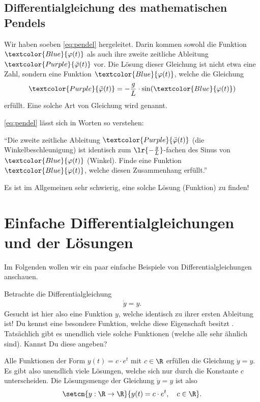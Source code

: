 \subsection{Differentialgleichung des mathematischen Pendels}
Wir haben soeben \cref{eq:pendel} hergeleitet. Darin kommen sowohl die Funktion $\textcolor{Blue}{\varphi (t)}$ als auch ihre zweite zeitliche Ableitung $\textcolor{Purple}{\ddot{\varphi} (t)}$ vor. 
Die Lösung dieser Gleichung ist nicht etwa eine Zahl, sondern eine Funktion $\textcolor{Blue}{\varphi (t)}$, welche die Gleichung
\begin{align*}
  \textcolor{Purple}{\ddot{\varphi} (t)} = -\frac{g}{L}\cdot\sin(\textcolor{Blue}{\varphi (t)})
\end{align*}
erfüllt. Eine solche Art von Gleichung wird  genannt.

\vspace{\baselineskip}
\cref{eq:pendel} lässt sich in Worten so verstehen:
\begin{center}
\enquote{Die zweite zeitliche Ableitung $\textcolor{Purple}{\ddot{\varphi} (t)}$ (die Winkelbeschleunigung) ist identisch zum $\lr{-\frac{g}{L}}$-fachen des Sinus von $\textcolor{Blue}{\varphi (t)}$ (Winkel).
Finde eine Funktion $\textcolor{Blue}{\varphi (t)}$, welche diesen Zusammenhang erfüllt.} 
\end{center}

Es ist im Allgemeinen sehr schwierig, eine solche Lösung (Funktion) zu finden!

\section{Einfache Differentialgleichungen und der Lösungen}
Im Folgenden wollen wir ein paar einfache Beispiele von Differentialgleichungen anschauen. 
\begin{myexercise}
  Betrachte die Differentialgleichung
  \begin{align*}
    \dot{y} = y.
  \end{align*}
  Gesucht ist hier also eine Funktion $y$, welche identisch zu ihrer ersten Ableitung ist!
  Du kennst eine besondere Funktion, welche diese Eigenschaft besitzt . 
  Tatsächlich gibt es unendlich viele solche Funktionen (welche alle sehr ähnlich sind). Kannst Du diese angeben?
  \begin{myanswer}
    Alle Funktionen der Form $y(t) = c\cdot e^t$ mit $c\in\R$ erfüllen die Gleichung $\dot{y} = y$. 
    Es gibt also unendlich viele Lösungen, welche sich nur durch die Konstante $c$ unterscheiden.
    Die Lösungsmenge der Gleichung $\dot{y} = y$ ist also
    \begin{align*}
      \setcm{y:\R\to\R}{y(t) = c\cdot e^t,\quad c\in\R}.
    \end{align*}
  \end{myanswer}
\end{myexercise}

